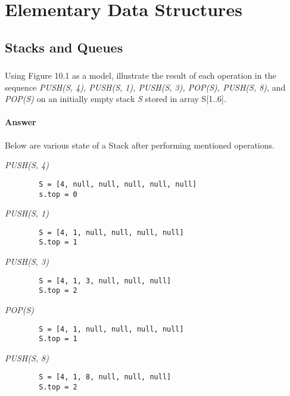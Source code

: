 \chapter{Elementary Data Structures}
  \section{Stacks and Queues}
    \subsection {}

    Using Figure 10.1 as a model, illustrate the result of each operation in
    the sequence \textit{PUSH(S, 4), PUSH(S, 1), PUSH(S, 3), POP(S), PUSH(S,
    8)}, and \textit{POP(S)} on an initially empty stack \textit{S} stored in
    array S[1..6].

      \subsubsection {Answer}

      Below are various state of a Stack after performing mentioned operations.

      \textit{PUSH(S, 4)}

      \begin{verbatim}
        S = [4, null, null, null, null, null]
        s.top = 0
      \end{verbatim}

      \textit{PUSH(S, 1)}

      \begin{verbatim}
        S = [4, 1, null, null, null, null]
        S.top = 1
      \end{verbatim}

      \textit{PUSH(S, 3)}

      \begin{verbatim}
        S = [4, 1, 3, null, null, null]
        S.top = 2
      \end{verbatim}

      \textit{POP(S)}

      \begin{verbatim}
        S = [4, 1, null, null, null, null]
        S.top = 1
      \end{verbatim}

      \textit{PUSH(S, 8)}

      \begin{verbatim}
        S = [4, 1, 8, null, null, null]
        S.top = 2
      \end{verbatim}


